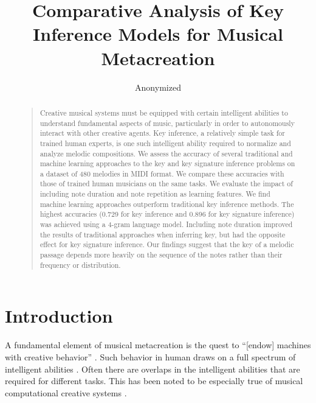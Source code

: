 \documentclass[letterpaper]{article}
\begin{document}
\title{Comparative Analysis of Key Inference Models for Musical Metacreation}
\author{Anonymized}
	\maketitle
	\begin{abstract}
		\begin{quote}
Creative musical systems must be equipped with certain intelligent abilities to understand fundamental aspects of music, particularly in order to autonomously interact with other creative agents. Key inference, a relatively simple task for trained human experts, is one such intelligent ability required to normalize and analyze melodic compositions. We assess the accuracy of several traditional and machine learning approaches to the key and key signature inference problems on a dataset of 480 melodies in MIDI format. We compare these accuracies with those of trained human musicians on the same tasks. We evaluate the impact of including note duration and note repetition as learning features. We find machine learning approaches outperform traditional key inference methods. The highest accuracies (0.729 for key inference and 0.896 for key signature inference) was achieved using a 4-gram language model. Including note duration improved the results of traditional approaches when inferring key, but had the opposite effect for key signature inference. Our findings suggest that the key of a melodic passage depends more heavily on the sequence of the notes rather than their frequency or distribution.
		\end{quote}
	\end{abstract}
	
\section{Introduction}

A fundamental element of musical metacreation is the quest to ``[endow] machines with creative behavior'' \cite{pasquier2012preface}. Such behavior in human draws on a full spectrum of intelligent abilities \cite{colton2012computational}. Often there are overlaps in the intelligent abilities that are required for different tasks. This has been noted to be especially true of musical computational creative systems \cite{bodily2017hbpl}.
\end{document}
